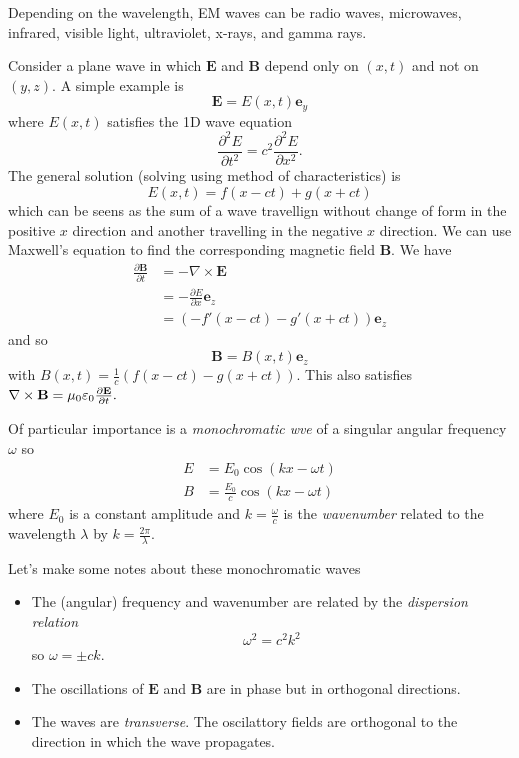 \documentclass{article}
\begin{document}
Depending on the wavelength, EM waves can be radio waves, microwaves, infrared, visible light, ultraviolet, x-rays, and gamma rays.
\begin{example}
  Consider a plane wave in which $ \mathbf E $ and $ \mathbf B $ depend only on $ (x,t) $ and not on $ (y,z) $. A simple example is
  \[
    \mathbf E = E(x,t)\mathbf e_y
  \]
  where $ E(x,t) $ satisfies the 1D wave equation
  \[
	  \frac{\partial^2 E}{\partial t^2} = c^2 \frac{\partial^2 E}{\partial x^2}.
  \]
  The general solution (solving using method of characteristics) is
  \[
    E(x,t) = f(x-ct) + g(x+ct)
  \]
  which can be seens as the sum of a wave travellign without change of form in the positive $ x $ direction and another travelling in the negative $ x $ direction. We can use Maxwell's equation to find the corresponding magnetic field $ \mathbf B $. We have
  \begin{align*}
	  \frac{\partial \mathbf B}{\partial t} &= - \nabla\times\mathbf E \\
						&= - \frac{\partial E}{\partial x} \mathbf e_z \\
						&= (-f'(x-ct) - g'(x+ct))\mathbf e_z
  \end{align*}
  and so
  \[
    \mathbf B = B(x,t)\mathbf e_z
  \]
  with $ B(x,t) = \frac 1c(f(x-ct)-g(x+ct)) $. This also satisfies $ \nabla\times\mathbf B = \mu_0 \varepsilon_0 \frac{\partial \mathbf E}{\partial t}. $
\end{example}
Of particular importance is a \textit{monochromatic wve} of a singular angular frequency $ \omega $ so
\begin{align*}
	E &= E_0 \cos(kx-\omega t) \\
	B &= \frac {E_0}c \cos(kx-\omega t)
\end{align*}
where $ E_0 $ is a constant amplitude and $ k = \frac \omega c $ is the \textit{wavenumber} related to the wavelength $ \lambda $ by $ k = \frac{2\pi}\lambda $.
\begin{remark}
  Let's make some notes about these monochromatic waves
  \begin{itemize}
	  \item The (angular) frequency and wavenumber are related by the \textit{dispersion relation} 
		  \[
		    \omega^2 = c^2 k^2
		  \]
		  so $ \omega = \pm ck $.
	  \item The oscillations of $ \mathbf E $ and $ \mathbf B $ are in phase but in orthogonal directions.
	  \item The waves are \textit{transverse}. The oscilattory fields are orthogonal to the direction in which the wave propagates.
  \end{itemize}
\end{remark}
\end{document}
